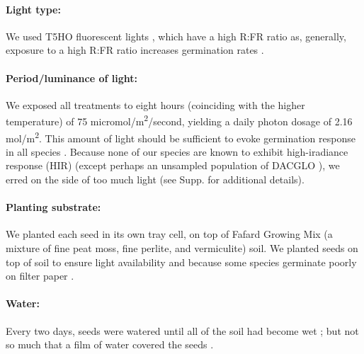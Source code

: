 \documentclass[12pt]{article}\usepackage[]{graphicx}\usepackage[]{color}
\begin{document}
	\paragraph{Light type:} We used T5HO fluorescent lights \parencite{Toole1963}, which have a high R:FR ratio as, generally, exposure to a high R:FR ratio increases germination rates \parencite[though across studies, some find successful germination requires high R:FR ratio or no effect][]{Popay1970,Pons2000,Wulff1994}. %
	
	\paragraph{Period/luminance of light:} We exposed all treatments to eight hours (coinciding with the higher temperature\parencite{Baskin1998}) of 75 micromol/m\textsuperscript{2}/second, yielding a daily photon dosage of 2.16 mol/m\textsuperscript{2}. This amount of light should be sufficient to evoke germination response in all species \parencite{Pons1991}. Because none of our species are known to exhibit high-iradiance response (HIR) (except perhaps an unsampled population of DACGLO \parencite{Probert1986}), we erred on the side of too much light (see Supp. for additional details). 
	
	\paragraph{Planting substrate:} We planted each seed in its own tray cell, on top of Fafard Growing Mix (a mixture of fine peat moss, fine perlite, and vermiculite) soil. We planted seeds on top of soil to ensure light availability \parencite{Tester1987} and because some species germinate poorly on filter paper \parencite{Andrews1974}.
	
	\paragraph{Water:} Every two days, seeds were watered until all of the soil had become wet \parencite{Steinbauer1957}; but not so much that a film of water covered the seeds \parencite{AOSA1960}.
	
\end{document}
